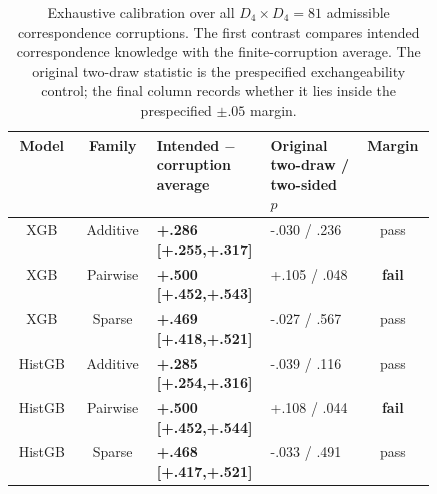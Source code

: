 \begin{table}[H]
\caption{Exhaustive calibration over all $D_4\times D_4=81$ admissible correspondence corruptions. The first contrast compares intended correspondence knowledge with the finite-corruption average. The original two-draw statistic is the prespecified exchangeability control; the final column records whether it lies inside the prespecified $\pm.05$ margin.}
\label{tab:app-correspondence-exchangeable-calibration}
\centering\scriptsize
\setlength{\tabcolsep}{3.5pt}
\begin{tabular}{ccP{0.27\linewidth}P{0.22\linewidth}c}
\toprule Model & Family & Intended $-$ corruption average & Original two-draw / two-sided $p$ & Margin \\
\midrule
XGB & Additive & \textbf{+.286 [+.255,+.317]} & -.030 / .236 & pass \\
XGB & Pairwise & \textbf{+.500 [+.452,+.543]} & +.105 / .048 & \textbf{fail} \\
XGB & Sparse & \textbf{+.469 [+.418,+.521]} & -.027 / .567 & pass \\
HistGB & Additive & \textbf{+.285 [+.254,+.316]} & -.039 / .116 & pass \\
HistGB & Pairwise & \textbf{+.500 [+.452,+.544]} & +.108 / .044 & \textbf{fail} \\
HistGB & Sparse & \textbf{+.468 [+.417,+.521]} & -.033 / .491 & pass \\
\bottomrule
\end{tabular}
\end{table}

